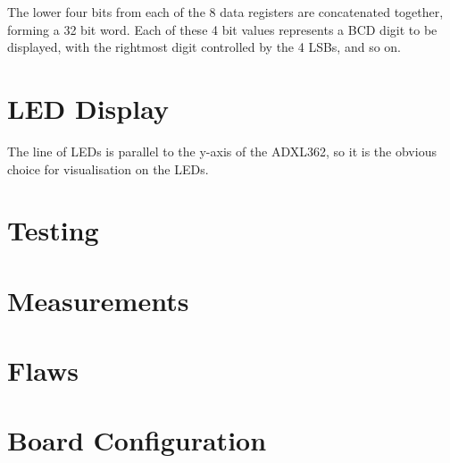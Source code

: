 \documentclass[11pt,british]{report}
\begin{document}
The lower four bits from each of the 8 data registers are concatenated together, forming a 32 bit word. Each of these 4 bit values represents a BCD digit to be displayed, with the rightmost digit controlled by the 4 LSBs, and so on.

\section*{LED Display}
The line of LEDs is parallel to the y-axis of the ADXL362, so it is the obvious choice for visualisation on the LEDs.

\section*{Testing}

\section*{Measurements}

\section*{Flaws}

\section*{Board Configuration}
\end{document}
